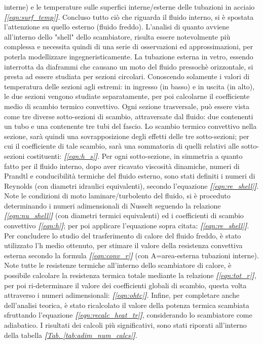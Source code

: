 \documentclass[a4paper,10pt]{article}                                                                                       %
\begin{document}
  interne) e le temperature sulle superfici interne/esterne delle tubazioni in acciaio
  \textit{\textbf{[}\ref{eqn:surf_temp}\textbf{]}}. Concluso tutto ciò che riguarda il fluido interno, si è spostata
  l'attenzione su quello esterno (fluido freddo). L'analisi di quanto avviene all'interno dello "shell" dello
  scambiatore, risulta essere notevolmente più complessa e necessita quindi di una serie di osservazioni ed
  approssimazioni, per poterla modellizzare ingegneristicamente. La tubazione esterna in vetro, essendo interrotta da
  diaframmi che causano un moto del fluido pressochè orizzontale, si presta ad essere studiata per sezioni circolari.
  Conoscendo solamente i valori di temperatura delle sezioni agli estremi: in ingresso (in basso) e in uscita (in alto),
  le due sezioni vengono studiate separatamente, per poi calcolarne il coefficiente medio di scambio termico convettivo.
  Ogni sezione trasversale, può essere vista come tre diverse sotto-sezioni di scambio, attraversate dal fluido: due
  contenenti un tubo e una contenente tre tubi del fascio. Lo scambio termico convettivo nella sezione, sarà quindi una
  sovrapposizione degli effetti delle tre sotto-sezioni; per cui il coefficiente di tale scambio, sarà una sommatoria
  di quelli relativi alle sotto-sezioni costituenti: \textit{\textbf{[}\ref{eqn:h_s}\textbf{]}}. Per ogni sotto-sezione,
  in simmetria a quanto fatto per il fluido interno, dopo aver ricavato viscosità dinamiche, numeri di Prandtl e
  conducibilità termiche del fluido esterno, sono stati definiti i numeri di Reynolds (con diametri idraulici equivalenti),
  secondo l'equazione \textit{\textbf{[}\ref{eqn:re_shell}\textbf{]}}. Note le condizioni di moto laminare/turbolento del
  fluido, si è proceduto determinando i numeri adimensionali di Nusselt seguendo la relazione
  \textit{\textbf{[}\ref{eqn:nu_shell}\textbf{]}} (con diametri termici equivalenti) ed i coefficienti di scambio
  convettivo \textit{\textbf{[}\ref{eqn:h}\textbf{]}}; per poi applicare l'equazione sopra citata:
  \textit{\textbf{[}\ref{eqn:re_shell}\textbf{]}}. Per concludere lo studio del trasferimento di calore del fluido freddo,
  è stato utilizzato l'h medio ottenuto, per stimare il valore della resistenza convettiva esterna secondo la formula
  \textit{\textbf{[}\ref{eqn:conv_r}\textbf{]}} (con A=area-esterna tubazioni interne). Note tutte le resistenze termiche
  all'interno dello scambiatore di calore, è possibile calcolare la resistenza termica totale mediante la relazione
  \textit{\textbf{[}\ref{eqn:tot_r}\textbf{]}}, per poi ri-determinare il valore dei coefficienti globali di scambio,
  questa volta attraverso i numeri adimensionali: \textit{\textbf{[}\ref{eqn:ohtc}\textbf{]}}. Infine, per completare
  anche dell'analisi teorica, è stato ricalcolato il valore della potenza termica scambiata sfruttando l'equazione
  \textit{\textbf{[}\ref{eqn:recalc_heat_tr}\textbf{]}}, considerando lo scambiatore come adiabatico. I risultati dei
  calcoli più significativi, sono stati riporati all'interno della tabella
  \textit{\textbf{[}\hyperref[tab:adim_num_calcs]{Tab. }\ref{tab:adim_num_calcs}\textbf{]}}.
\clearpage                                                                                                                  %
\end{document}
